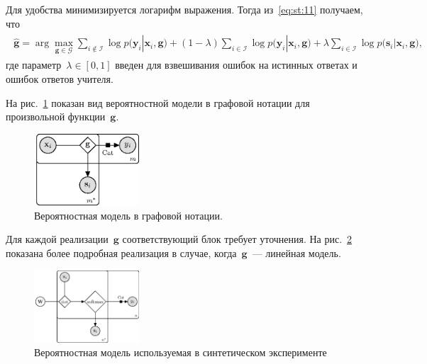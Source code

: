 \documentclass{dissert}
\begin{document}
Для удобства минимизируется логарифм выражения. Тогда из~\eqref{eq:st:11} получаем, что
\begin{gather}
\label{eq:st:12}
\begin{aligned}
\hat{\mathbf{g}} = \arg\max_{\mathbf{g}\in \mathcal{G}} \sum_{i\not\in \mathcal{I}}\log p\bigr(\mathbf{y}_i|\mathbf{x}_i, \mathbf{g}\bigr) + \left(1-\lambda\right)\sum_{i\in \mathcal{I}}\log p\bigr(\mathbf{y}_i|\mathbf{x}_i, \mathbf{g}\bigr) + \lambda\sum_{i\in \mathcal{I}}\log p\bigr(\mathbf{s}_i|\mathbf{x}_i, \mathbf{g}\bigr),
\end{aligned}
\end{gather}
где параметр~$\lambda \in [0,1]$ введен для взвешивания ошибок на истинных ответах и ошибок ответов учителя.

На рис.~\ref{fg:st:plate} показан вид вероятностной модели в графовой нотации для произвольной функции~$\mathbf{g}$.

\begin{figure}[!ht]\center
\includegraphics[width=0.35\textwidth]{results/privlearn/general_model}
\caption{Вероятностная модель в графовой нотации.}
\label{fg:st:plate}
\end{figure}

Для каждой реализации~$\mathbf{g}$ соответствующий блок требует уточнения. На рис.~\ref{fg:ex:synt:plate} показана более подробная реализация в случае, когда~$\mathbf{g}$~--- линейная модель.

\begin{figure}[!ht]\center
\includegraphics[width=0.35\textwidth]{results/privlearn/linear_model}
\caption{Вероятностная модель используемая в синтетическом эксперименте}
\label{fg:ex:synt:plate}
\end{figure}
\end{document}
